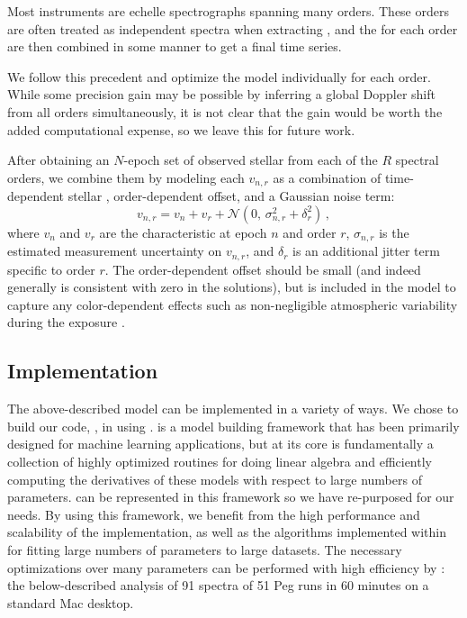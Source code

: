 \documentclass[modern]{aastex62}
\begin{document}
Most \EPRV instruments are echelle spectrographs spanning many orders. 
These orders are often treated as independent spectra when extracting \RVs, and the \RVs for each order are then combined in some manner to get a final time series. 

We follow this precedent and optimize the \wobble model individually for each order. 
While some \RV precision gain may be possible by inferring a global Doppler shift from all orders simultaneously, it is not clear that the gain would be worth the added computational expense, so we leave this for future work. 

After obtaining an $N$-epoch set of observed stellar \RVs from each of the $R$ spectral orders, we combine them by modeling each \RV $v_{n,r}$ as a combination of time-dependent stellar \RV, order-dependent \RV offset, and a Gaussian noise term:
\begin{equation}
v_{n,r} = v_n + v_r + \mathcal{N}(0,\,\sigma_{n,r}^{2} + \delta_r^2 )\,,
\end{equation}
where $v_n$ and $v_r$ are the characteristic \RVs at epoch $n$ and order $r$, $\sigma_{n,r}$ is the estimated measurement uncertainty on $v_{n,r}$, and $\delta_r$ is an additional jitter term specific to order $r$. 
The order-dependent \RV offset should be small (and indeed generally is consistent with zero in the solutions), but is included in the model to capture any color-dependent effects such as non-negligible atmospheric variability during the exposure \citep[see e.g.][]{Blackwell2017}. 

\subsection{Implementation}
\label{s:implementation}

The above-described model can be implemented in a variety of ways. We chose to build our code, \wobble, in  using \TF. 
\TF is a model building framework that has been primarily designed for machine
learning applications, but at its core \TF is fundamentally a collection of
highly optimized routines for doing linear algebra and efficiently computing the
derivatives of these models with respect to large numbers of parameters.
\wobble can be represented in this framework so we have re-purposed \TF for our
needs.
By using this framework, we benefit from the high performance and scalability
of the implementation, as well as the algorithms implemented within \TF for
fitting large numbers of parameters to large datasets.
The necessary optimizations over many parameters can be performed with high efficiency by \TF: the below-described analysis of 91 spectra of 51 Peg runs in 60 minutes on a standard Mac desktop.
\end{document}
